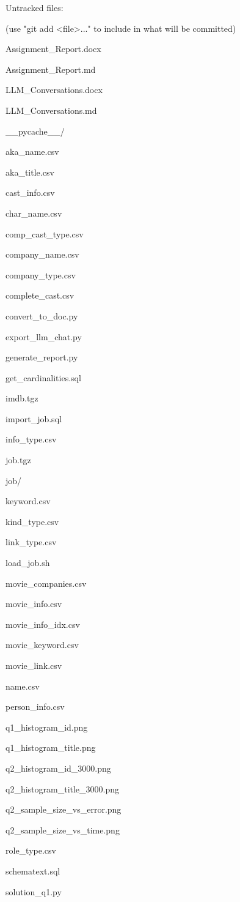 \documentclass[11pt,a4paper]{article}
\begin{document}
{Untracked files:

(use "git add <file>..." to include in what will be committed)

Assignment\_Report.docx

Assignment\_Report.md

LLM\_Conversations.docx

LLM\_Conversations.md

\_\_pycache\_\_/

aka\_name.csv

aka\_title.csv

cast\_info.csv

char\_name.csv

comp\_cast\_type.csv

company\_name.csv

company\_type.csv

complete\_cast.csv

convert\_to\_doc.py

export\_llm\_chat.py

generate\_report.py

get\_cardinalities.sql

imdb.tgz

import\_job.sql

info\_type.csv

job.tgz

job/

keyword.csv

kind\_type.csv

link\_type.csv

load\_job.sh

movie\_companies.csv

movie\_info.csv

movie\_info\_idx.csv

movie\_keyword.csv

movie\_link.csv

name.csv

person\_info.csv

q1\_histogram\_id.png

q1\_histogram\_title.png

q2\_histogram\_id\_3000.png

q2\_histogram\_title\_3000.png

q2\_sample\_size\_vs\_error.png

q2\_sample\_size\_vs\_time.png

role\_type.csv

schematext.sql

solution\_q1.py

}
\end{document}
